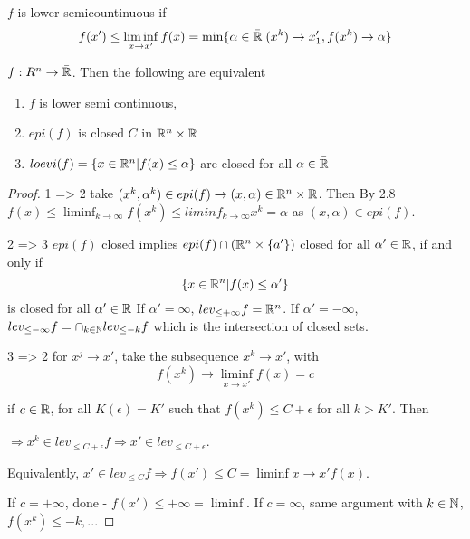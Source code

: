 \begin{defn}
  \label{defn:new_convex:2}
  $f$ is lower semicountinuous if
  \begin{equation}
    \label{eq:6}
    f(x') \leq \liminf_{x \rightarrow x'} f(x) = \min \{\alpha \in \bar
    {\mathbb{R}} | (x^{k}) \rightarrow x_{1}', f(x^{k}) \rightarrow \alpha \}
  \end{equation}

\end{defn}

\begin{thm}
  \label{defn:new_convex:1}
  $f: R^{n} \rightarrow \bar {\mathbb{R}}$.  Then the following are equivalent
  \begin{enumerate}
  \item $f$ is lower semi continuous,
  \item $epi(f)$ is closed $C$ in $\mathbb{R}^{n} \times \mathbb{R}$
  \item $loevi(f) = \{ x \in \mathbb{R}^{n} | f(x) \leq \alpha \}$ are closed
    for all $\alpha \in \bar {\mathbb{R}}$
  \end{enumerate}
\end{thm}

\begin{proof}
  1 => 2 take $(x^{k}, \alpha^{k}) \in epi(f) \rightarrow (x, \alpha)
  \in \mathbb{R}^{n} \times \mathbb{R}$.  Then By 2.8 $f(x) \leq \liminf_{k
    \rightarrow \infty} f(x^{k}) \leq liminf_{k \rightarrow \infty}
  x^{k} = \alpha$ as $(x, \alpha) \in epi(f)$.

  2 => 3 $epi(f)$ closed implies $epi(f) \cap (\mathbb{R}^{n} \times \{ a'
  \})$ closed for all $\alpha' \in \mathbb{R}$, if and only if
  \begin{equation}
    \label{eq:7}
    \{ x \in \mathbb{R}^{n} | f(x) \leq \alpha' \}
  \end{equation} is closed for all $\alpha' \in \mathbb{R}$
  If $\alpha' = \infty$, $lev_{\leq +\infty}f = \mathbb{R}^{n}$.
  If $\alpha' = -\infty$, $lev_{\leq -\infty} f = \cap_{k \in \mathbb{N}}
    lev_{\leq -k} f$ which is the intersection of closed sets.
  
  3 => 2 for $x^{j} \rightarrow x'$, take the subsequence $x^{k}
  \rightarrow x'$, with
  \begin{equation}
    \label{eq:8}
    f(x^{k}) \rightarrow \liminf_{x \rightarrow x'} f(x) = c
  \end{equation}

  if $c \in \mathbb{R}$, for all $K(\epsilon) = K'$ such that $f(x^{k}) \leq C
  + \epsilon$ for all $k > K'$. Then

  $\Rightarrow x^{k} \in lev_{\leq C + \epsilon} f \Rightarrow x' \in
  lev_{\leq C + \epsilon}$.

  Equivalently, $x' \in lev_{\leq C} f \Rightarrow f(x') \leq C =
  \liminf{x \rightarrow x'} f(x)$.

  If $c = +\infty$, done - $f(x') \leq +\infty = \liminf$.
  If $c = \infty$, same argument with $k \in \mathbb{N}$, $f(x^{k}) \leq -k, ..$.
\end{proof}


